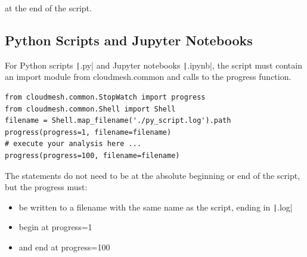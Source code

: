 at the end of the script.

\subsection{Python Scripts and Jupyter
Notebooks}\label{python-scripts-and-jupyter-notebooks}

For Python scripts \texttt|.py| and Jupyter notebooks \texttt|.ipynb|,
the script must contain an import module from cloudmesh.common and calls
to the progress function.


\smallskip
\begin{verbatim}
from cloudmesh.common.StopWatch import progress
from cloudmesh.common.Shell import Shell
filename = Shell.map_filename('./py_script.log').path
progress(progress=1, filename=filename)
# execute your analysis here ...
progress(progress=100, filename=filename)
\end{verbatim}
\smallskip

The statements do not need to be at the absolute beginning or end of the
script, but the progress must:

\begin{itemize}
\item
  be written to a filename with the same name as the script, ending in
  \texttt|.log|
\item
  begin at progress=1
\item
  and end at progress=100
\end{itemize}
